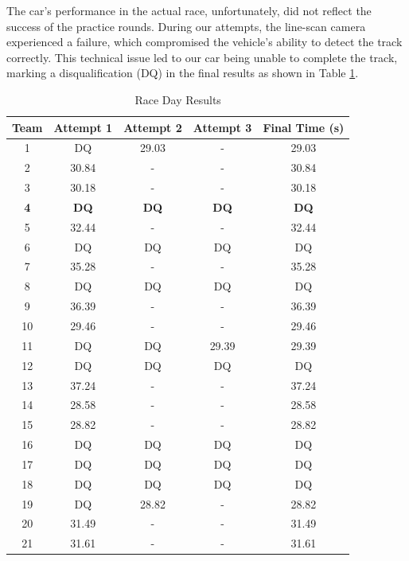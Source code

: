 \documentclass[conference]{IEEEtran}
\begin{document}
The car's performance in the actual race, unfortunately, did not reflect the success of the practice rounds. During our attempts, the line-scan camera experienced a failure, which compromised the vehicle's ability to detect the track correctly. This technical issue led to our car being unable to complete the track, marking a disqualification (DQ) in the final results as shown in Table \ref{tab:raceResults}.

\begin{table}[htbp]
	\caption{Race Day Results}
	\begin{center}
	\begin{tabular}{|c|c|c|c|c|}
		\hline
		\textbf{Team} & \textbf{Attempt 1} & \textbf{Attempt 2} & \textbf{Attempt 3} & \textbf{Final Time (s)} \\
		\hline
		1 & DQ & 29.03 & - & 29.03 \\
		2 & 30.84 & - & - & 30.84 \\
		3 & 30.18 & - & - & 30.18 \\
		\textbf{4} & \textbf{DQ} & \textbf{DQ} & \textbf{DQ} & \textbf{DQ} \\
		5 & 32.44 & - & - & 32.44 \\
		6 & DQ & DQ & DQ & DQ \\
		7 & 35.28 & - & - & 35.28 \\
		8 & DQ & DQ & DQ & DQ \\
		9 & 36.39 & - & - & 36.39 \\
		10 & 29.46 & - & - & 29.46 \\
		11 & DQ & DQ & 29.39 & 29.39 \\
		12 & DQ & DQ & DQ & DQ \\
		13 & 37.24 & - & - & 37.24 \\
		14 & 28.58 & - & - & 28.58 \\
		15 & 28.82 & - & - & 28.82 \\
		16 & DQ & DQ & DQ & DQ \\
		17 & DQ & DQ & DQ & DQ \\
		18 & DQ & DQ & DQ & DQ \\
		19 & DQ & 28.82 & - & 28.82 \\
		20 & 31.49 & - & - & 31.49 \\
		21 & 31.61 & - & - & 31.61 \\

		\hline
	\end{tabular}
	\label{tab:raceResults}
	\end{center}
\end{table}
\end{document}

